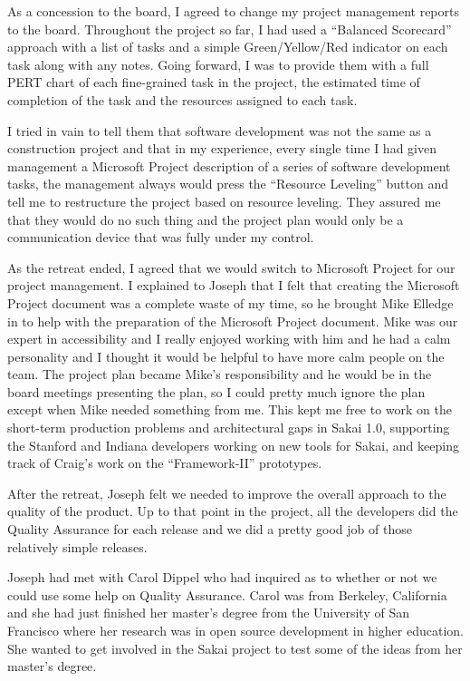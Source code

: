\documentclass[12pt]{book}
\begin{document}
As a concession to the board, I agreed to change my
project management reports to the board.  Throughout
the project so far, I had used a ``Balanced Scorecard''
approach with a list of tasks and a simple
Green\slash Yellow\slash Red indicator on each task along with
any notes.  Going forward, I was to provide them
with a full PERT chart of each fine-grained task
in the project, the estimated time of completion
of the task and the resources assigned to each task.

I tried in vain to tell them that software development
was not the same as a construction project and that
in my experience, every single time I had given management
a Microsoft Project description of a series of software
development tasks, the management always would press
the ``Resource Leveling'' button and tell me to
restructure the project based on resource leveling.
They assured me that they would do no such thing and
the project plan would only be a communication device
that was fully under my control.

As the retreat ended, I agreed that we would switch
to Microsoft Project for our project management.
I explained to Joseph that I felt that creating the Microsoft Project
document was a complete waste of my time, so he
brought Mike Elledge in to help with the preparation
of the Microsoft Project document.  Mike was our expert
in accessibility and I really enjoyed working with him
and he had a calm personality and I thought it would
be helpful to have more calm people on the team.
The project plan became Mike's responsibility
and he would be in the board meetings presenting
the plan, so I could pretty much ignore the plan
except when Mike needed something from me.
This kept me free to work on the short-term production
problems and architectural gaps in Sakai 1.0, supporting
the Stanford and Indiana developers working on
new tools for Sakai, and keeping track of Craig's work
on the ``Framework-II'' prototypes.

After the retreat, Joseph felt we needed to
improve the overall approach to the quality of the product.
Up to that point in the project, all the developers
did the Quality Assurance for each release and we did a
pretty good job of those relatively simple releases.

Joseph had met with Carol Dippel who had
inquired as to whether or not we could use some help
on Quality Assurance.
Carol was from Berkeley, California
and she had just finished her master's degree
from the University of San Francisco
where her research was in open source development in higher education.
She wanted to get involved
in the Sakai project to test some of the ideas from
her master's degree.
\end{document}
